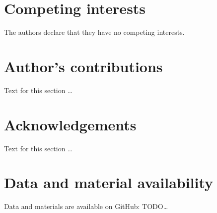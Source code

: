 \documentclass[twocolumn]{bmcart}%
\begin{document}
\begin{backmatter}

\section*{Competing interests}
  The authors declare that they have no competing interests.

\section*{Author's contributions}
    Text for this section \ldots

\section*{Acknowledgements}
  Text for this section \ldots
  
\section*{Data and material availability}
  Data and materials are available on GitHub:
  TODO\ldots




\end{backmatter}
\end{document}
